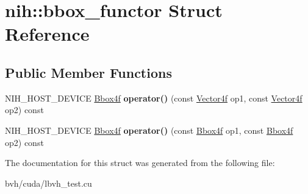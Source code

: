 \hypertarget{structnih_1_1bbox__functor}{
\section{nih\-:\-:bbox\-\_\-functor \-Struct \-Reference}
\label{structnih_1_1bbox__functor}
}
\subsection*{\-Public \-Member \-Functions}
\begin{DoxyCompactItemize}
\item 
\hypertarget{structnih_1_1bbox__functor_ade0e8ea51d882e2bbf5f6f29717a50cd}{
\-N\-I\-H\-\_\-\-H\-O\-S\-T\-\_\-\-D\-E\-V\-I\-C\-E \hyperlink{structnih_1_1_bbox}{\-Bbox4f} {\bfseries operator()} (const \hyperlink{structnih_1_1_vector}{\-Vector4f} op1, const \hyperlink{structnih_1_1_vector}{\-Vector4f} op2) const }
\label{structnih_1_1bbox__functor_ade0e8ea51d882e2bbf5f6f29717a50cd}

\item 
\hypertarget{structnih_1_1bbox__functor_a7b056f7a5bac15e09c3300e5a3d04516}{
\-N\-I\-H\-\_\-\-H\-O\-S\-T\-\_\-\-D\-E\-V\-I\-C\-E \hyperlink{structnih_1_1_bbox}{\-Bbox4f} {\bfseries operator()} (const \hyperlink{structnih_1_1_bbox}{\-Bbox4f} op1, const \hyperlink{structnih_1_1_bbox}{\-Bbox4f} op2) const }
\label{structnih_1_1bbox__functor_a7b056f7a5bac15e09c3300e5a3d04516}

\end{DoxyCompactItemize}


\-The documentation for this struct was generated from the following file\-:\begin{DoxyCompactItemize}
\item 
bvh/cuda/lbvh\-\_\-test.\-cu\end{DoxyCompactItemize}
